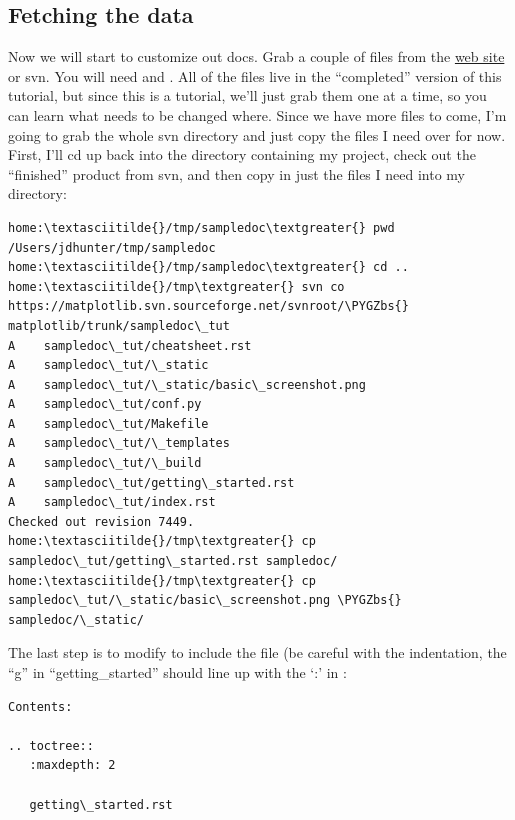 \documentclass[letterpaper,10pt,english]{sphinxmanual}
\def\PYGZbs{\char`\\}
\begin{document}
\subsection{Fetching the data}
\label{getting_started_ex:id2}\label{getting_started_ex:fetching-the-data}
Now we will start to customize out docs.  Grab a couple of files from
the \href{http://matplotlib.svn.sourceforge.net/viewvc/matplotlib/trunk/sampledoc\_tut/}{web site}
or svn.  You will need  and
.  All of the files live in the
``completed'' version of this tutorial, but since this is a tutorial,
we'll just grab them one at a time, so you can learn what needs to be
changed where.  Since we have more files to come, I'm going to grab
the whole svn directory and just copy the files I need over for now.
First, I'll cd up back into the directory containing my project, check
out the ``finished'' product from svn, and then copy in just the files I
need into my  directory:

\begin{Verbatim}[commandchars=\\\{\}]
home:\textasciitilde{}/tmp/sampledoc\textgreater{} pwd
/Users/jdhunter/tmp/sampledoc
home:\textasciitilde{}/tmp/sampledoc\textgreater{} cd ..
home:\textasciitilde{}/tmp\textgreater{} svn co https://matplotlib.svn.sourceforge.net/svnroot/\PYGZbs{}
matplotlib/trunk/sampledoc\_tut
A    sampledoc\_tut/cheatsheet.rst
A    sampledoc\_tut/\_static
A    sampledoc\_tut/\_static/basic\_screenshot.png
A    sampledoc\_tut/conf.py
A    sampledoc\_tut/Makefile
A    sampledoc\_tut/\_templates
A    sampledoc\_tut/\_build
A    sampledoc\_tut/getting\_started.rst
A    sampledoc\_tut/index.rst
Checked out revision 7449.
home:\textasciitilde{}/tmp\textgreater{} cp sampledoc\_tut/getting\_started.rst sampledoc/
home:\textasciitilde{}/tmp\textgreater{} cp sampledoc\_tut/\_static/basic\_screenshot.png \PYGZbs{}
sampledoc/\_static/
\end{Verbatim}

The last step is to modify  to include the
 file (be careful with the indentation, the
``g'' in ``getting\_started'' should line up with the `:' in :

\begin{Verbatim}[commandchars=\\\{\}]
Contents:

.. toctree::
   :maxdepth: 2

   getting\_started.rst
\end{Verbatim}
\end{document}
